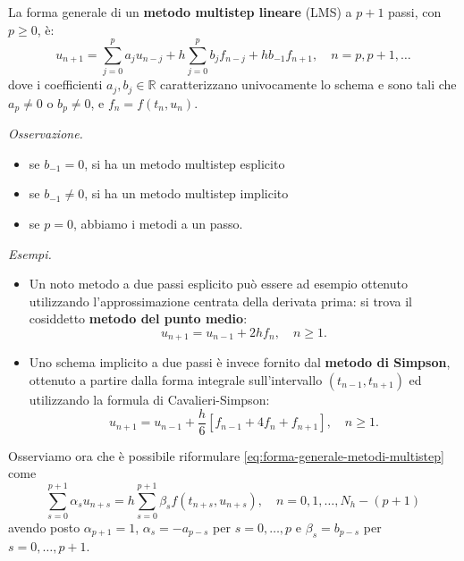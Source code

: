 La forma generale di un \textbf{metodo multistep lineare} (LMS) a $p+1$ passi, con $p\geqslant 0$, è:
\begin{equation}
u_{n+1} =\sum\limits ^{p}_{j=0} a_{j} u_{n-j} +h\sum\limits ^{p}_{j=0} b_{j} f_{n-j} +hb_{-1} f_{n+1} ,\quad n=p,p+1,\dotsc
\label{eq:forma-generale-metodi-multistep}
\end{equation}
dove i coefficienti $a_{j} ,b_{j} \in \mathbb{R}$ caratterizzano univocamente lo schema e sono tali che $a_{p} \neq 0$ o $b_{p} \neq 0$, e $f_{n} =f( t_{n} ,u_{n})$.

\textit{Osservazione.}
\begin{itemize}
\item se $b_{-1} =0$, si ha un metodo multistep esplicito
\item se $b_{-1} \neq 0$, si ha un metodo multistep implicito
\item se $p=0$, abbiamo i metodi a un passo.
\end{itemize}

\textit{Esempi.}
\begin{itemize}
\item Un noto metodo a due passi esplicito può essere ad esempio ottenuto utilizzando l’approssimazione centrata della derivata prima: si trova il cosiddetto \textbf{metodo del punto medio}:
\begin{equation*}
u_{n+1} =u_{n-1} +2hf_{n} ,\quad n\geqslant 1.
\end{equation*}
\item Uno schema implicito a due passi è invece fornito dal \textbf{metodo di Simpson}, ottenuto a partire dalla forma integrale sull’intervallo $( t_{n-1} ,t_{n+1})$ ed utilizzando la formula di Cavalieri-Simpson:
\begin{equation*}
u_{n+1} =u_{n-1} +\frac{h}{6}[ f_{n-1} +4f_{n} +f_{n+1}] ,\quad n\geqslant 1.
\end{equation*}
\end{itemize}

Osserviamo ora che è possibile riformulare \eqref{eq:forma-generale-metodi-multistep} come
\begin{equation}
\sum\limits ^{p+1}_{s=0} \alpha _{s} u_{n+s} =h\sum\limits ^{p+1}_{s=0} \beta _{s} f( t_{n+s} ,u_{n+s}) ,\quad n=0,1,\dotsc ,N_{h} -( p+1)
\end{equation}
avendo posto $\alpha _{p+1} =1$, $\alpha _{s} =-a_{p-s}$ per $s=0,\dotsc ,p$ e $\beta _{s} =b_{p-s}$ per $s=0,\dotsc ,p+1$.


